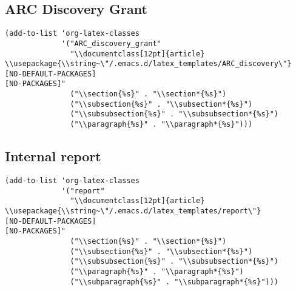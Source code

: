 \documentclass[12pt]{article}
\begin{document}
\subsection{ARC Discovery Grant}
\label{sec-5-13}

\lstset{language=Lisp,label= ,caption= ,numbers=none}
\begin{lstlisting}
(add-to-list 'org-latex-classes
             '("ARC_discovery_grant"
               "\\documentclass[12pt]{article}
\\usepackage{\\string~\"/.emacs.d/latex_templates/ARC_discovery\"}
[NO-DEFAULT-PACKAGES]
[NO-PACKAGES]"
               ("\\section{%s}" . "\\section*{%s}")
               ("\\subsection{%s}" . "\\subsection*{%s}")
               ("\\subsubsection{%s}" . "\\subsubsection*{%s}")
               ("\\paragraph{%s}" . "\\paragraph*{%s}")))
\end{lstlisting}

\subsection{Internal report}
\label{sec-5-14}
\lstset{language=Lisp,label= ,caption= ,numbers=none}
\begin{lstlisting}
(add-to-list 'org-latex-classes
             '("report"
               "\\documentclass[12pt]{article}
\\usepackage{\\string~\"/.emacs.d/latex_templates/report\"}
[NO-DEFAULT-PACKAGES]
[NO-PACKAGES]"
               ("\\section{%s}" . "\\section*{%s}")
               ("\\subsection{%s}" . "\\subsection*{%s}")
               ("\\subsubsection{%s}" . "\\subsubsection*{%s}")
               ("\\paragraph{%s}" . "\\paragraph*{%s}")
               ("\\subparagraph{%s}" . "\\subparagraph*{%s}")))
\end{lstlisting}
\end{document}
